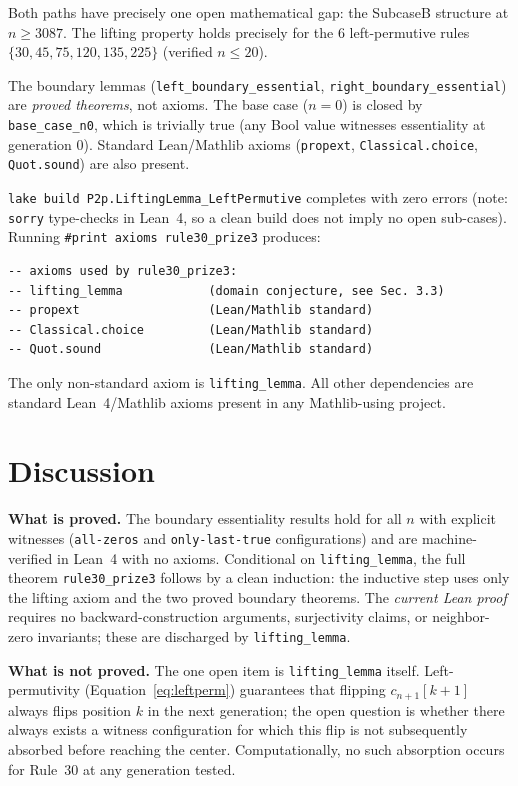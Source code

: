 \documentclass[11pt]{article}
\theoremstyle{plain}
\theoremstyle{definition}
\begin{document}
Both paths have precisely one open mathematical gap: the SubcaseB structure at $n \geq 3087$.
The lifting property holds precisely for the 6 left-permutive rules $\{30, 45, 75, 120, 135, 225\}$
(verified $n \leq 20$).

The boundary lemmas (\texttt{left\_boundary\_essential},
\texttt{right\_boundary\_essential}) are \emph{proved theorems}, not axioms.  The
base case ($n = 0$) is closed by \texttt{base\_case\_n0}, which is trivially true
(any Bool value witnesses essentiality at generation 0).  Standard Lean/Mathlib
axioms (\texttt{propext}, \texttt{Classical.choice}, \texttt{Quot.sound}) are also
present.

\texttt{lake build P2p.LiftingLemma\_LeftPermutive} completes with zero errors (note:
\texttt{sorry} type-checks in Lean~4, so a clean build does not imply no open
sub-cases).  Running \verb|#print axioms rule30_prize3| produces:

\begin{lstlisting}
-- axioms used by rule30_prize3:
-- lifting_lemma            (domain conjecture, see Sec. 3.3)
-- propext                  (Lean/Mathlib standard)
-- Classical.choice         (Lean/Mathlib standard)
-- Quot.sound               (Lean/Mathlib standard)
\end{lstlisting}

The only non-standard axiom is \texttt{lifting\_lemma}.  All other dependencies
are standard Lean~4/Mathlib axioms present in any Mathlib-using project.

\section{Discussion}
\label{sec:discussion}

\textbf{What is proved.}  The boundary essentiality results hold for all $n$ with
explicit witnesses (\texttt{all-zeros} and \texttt{only-last-true} configurations)
and are machine-verified in Lean~4 with no axioms.  Conditional on
\texttt{lifting\_lemma}, the full theorem \texttt{rule30\_prize3} follows by a clean
induction: the inductive step uses only the lifting axiom and the two proved boundary
theorems.  The \emph{current Lean proof} requires no backward-construction
arguments, surjectivity claims, or neighbor-zero invariants; these are discharged by
\texttt{lifting\_lemma}.

\textbf{What is not proved.}  The one open item is \texttt{lifting\_lemma} itself.
Left-permutivity (Equation~\eqref{eq:leftperm}) guarantees that flipping
$c_{n+1}[k+1]$ always flips position $k$ in the next generation; the open question
is whether there always exists a witness configuration for which this flip is not
subsequently absorbed before reaching the center.  Computationally, no such
absorption occurs for Rule~30 at any generation tested.
\end{document}
